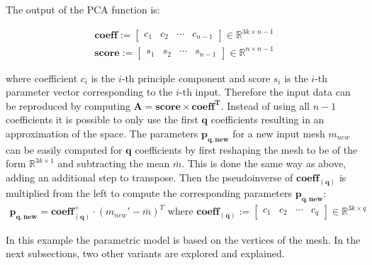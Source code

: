 The output of the PCA function is:

\begin{gather}
\mathbf{coeff} :=
\begin{bmatrix}
 c_1&c_2&\cdots&c_{n-1}
\end{bmatrix}
\in \mathbb{R}^{3k \times n-1}
\end{gather}
\begin{gather}
\mathbf{score} :=
\begin{bmatrix}
s_1&s_2&\cdots&s_{n-1}
\end{bmatrix}
\in \mathbb{R}^{n \times n-1}
\end{gather}

where coefficient $c_i$ is the $i$-th principle component and score $s_i$ is the $i$-th parameter vector corresponding to the $i$-th input. Therefore the input data can be reproduced by computing $\mathbf{A = score \times {coeff}^T}$. Instead of using all $n-1$ coefficients it is possible to only use the first $\mathbf{q}$ coefficients resulting in an approximation of the space. The parameters $\mathbf{p_{q,new}}$ for a new input mesh $m_{new}$ can be easily computed for $\mathbf{q}$ coefficients by first reshaping the mesh to be of the form $\mathbb{R}^{3k \times 1}$ and subtracting the mean $\bar{m}$. This is done the same way as above, adding an additional step to transpose. Then the pseudoinverse of $\mathbf{coeff_{(q)}}$ is multiplied from the left to compute the corresponding parameters $\mathbf{p_{q,new}}$:
\begin{gather}
\mathbf{p_{q,new}} = \mathbf{coeff^+_{(q)}} \cdot (m_{new}' - \bar{m})^T  \text{  where }
\mathbf{coeff_{(q)}} :=
\begin{bmatrix}
 c_1&c_2&\cdots&c_{q}
\end{bmatrix}
\in \mathbb{R}^{3k \times q}
\end{gather}

In this example the parametric model is based on the vertices of the mesh. In the next subsections, two other variants are explored and explained.
